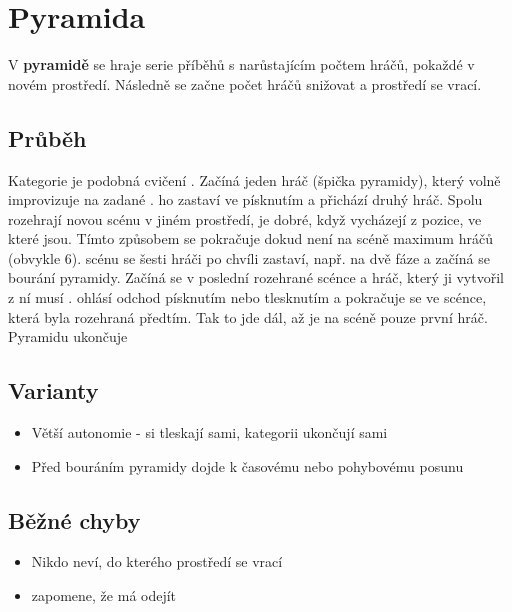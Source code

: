 \documentclass[main.tex]{subfiles}
\begin{document}
 
 
 
 
 
 
 
 
\needspace{5cm} \section{Pyramida} \label{pyramida}  
 
V \textbf{pyramidě}{} se hraje serie příběhů s narůstajícím počtem hráčů, pokaždé v novém prostředí. Následně se začne počet hráčů snižovat a prostředí se vrací. 
 
 
\subsection{ Průběh } Kategorie je podobná cvičení . Začíná jeden hráč (špička pyramidy), který volně improvizuje na zadané .  ho zastaví ve  písknutím a přichází druhý hráč. Spolu rozehrají novou scénu v jiném prostředí, je dobré, když vycházejí z pozice, ve které jsou. Tímto způsobem se pokračuje dokud není na scéně maximum hráčů (obvykle 6). 
 scénu se šesti hráči po chvíli zastaví,  např. na dvě fáze   a začíná se bourání pyramidy. Začíná se v poslední rozehrané scénce a hráč, který ji vytvořil z ní musí .  ohlásí odchod písknutím nebo tlesknutím a pokračuje se ve scénce, která byla rozehraná předtím. Tak to jde dál, až je na scéně pouze první hráč. Pyramidu ukončuje  
 
\subsection{ Varianty } \begin{itemize}
\item Větší autonomie -  si tleskají sami, kategorii ukončují sami
\item Před bouráním pyramidy dojde k časovému nebo pohybovému posunu
\end{itemize}
 
\subsection{ Běžné chyby } \begin{itemize}
\item Nikdo neví, do kterého prostředí se vrací
\item {} zapomene, že má odejít
\end{itemize}
 
\end{document}
